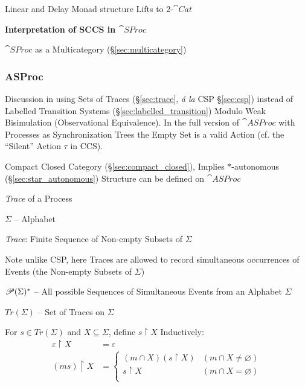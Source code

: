 Linear and Delay Monad structure Lifts to $2$-$\cat{Cat}$



\textbf{Interpretation of SCCS in $\cat{SProc}$}

$\cat{SProc}$ as a Multicategory (\S\ref{sec:multicategory})



\subsubsection{ASProc}\label{sec:asproc}

\cite{abramsky-gay-nagarajan96}

\fist Discussion in \cite{abramsky-gay-nagarajan96} using Sets of
Traces (\S\ref{sec:trace}, \emph{\'a la} CSP \S\ref{sec:csp}) instead
of Labelled Transition Systems (\S\ref{sec:labelled_transition})
Modulo Weak Bisimulation (Observational Equivalence). In the full
version of $\cat{ASProc}$ with Processes as Synchronization Trees the
Empty Set is a valid Action (cf. the ``Silent'' Action $\tau$ in CCS).

Compact Closed Category (\S\ref{sec:compact_closed}), Implies
$*$-autonomous (\S\ref{sec:star_autonomous}) Structure can be defined
on $\cat{ASProc}$

\emph{Trace} of a Process

$\Sigma$ -- Alphabet

\emph{Trace}: Finite Sequence of Non-empty Subsets of $\Sigma$

\fist Note unlike CSP, here Traces are allowed to record
simultaneous occurrences of Events (the Non-empty Subsets of $\Sigma$)

\interrobang $\mathscr{P}(\Sigma)^*$ -- All possible Sequences of
Simultaneous Events from an Alphabet $\Sigma$

$Tr(\Sigma)$ -- Set of Traces on $\Sigma$

For $s \in Tr(\Sigma)$ and $X \subseteq \Sigma$, define $s
\upharpoonright X$ Inductively:
\begin{align*}
  \varepsilon \upharpoonright X &= \varepsilon \\
  (ms) \upharpoonright X &=
    \begin{cases}
      (m \cap X)(s \upharpoonright X) & (m \cap X \neq \varnothing) \\
      s \upharpoonright X & (m \cap X = \varnothing) \\
    \end{cases}
\end{align*}

